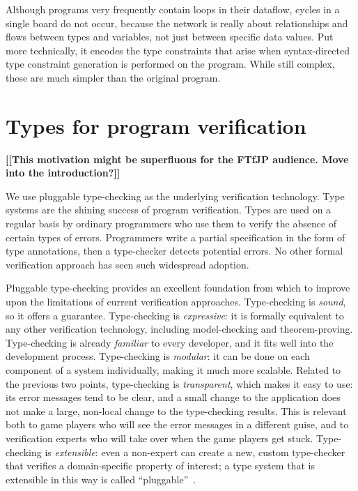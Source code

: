 \documentclass{sig-alternate}
\newcommand{\todo}[1]{{\color{red}\bfseries [[#1]]}}
\begin{document}
Although programs very frequently contain loops in their dataflow,
cycles in a single board do not occur, because the network is really
about relationships and flows between types and variables, not just
between specific data values.  Put more technically, it encodes the
type constraints that arise when syntax-directed type constraint
generation is performed on the program.  While still complex, these
are much simpler than the original program.



\section{Types for program verification}
\label{sec:types}

\todo{This motivation might be superfluous for the FTfJP
  audience. Move into the introduction?}

We use pluggable type-checking as the underlying verification
technology.  Type systems are the shining success of program
verification.  Types are used on a regular basis by ordinary
programmers who use them to verify the absence of certain types of
errors.  Programmers write a partial specification in the form of type
annotations, then a type-checker detects potential errors.  No other
formal verification approach has seen such widespread adoption.

Pluggable type-checking provides an excellent foundation from which to
improve upon the limitations of current verification
approaches. Type-checking is \emph{sound}, so it offers a guarantee.
Type-checking is \emph{expressive}: it is formally equivalent
\cite{CurryHoward2006,MartinLoef1984,CoquandHuet1988,Cousot1997,CousotCousot2000,NaikPalsberg2005}
to any other verification technology, including model-checking and
theorem-proving.  Type-checking is already \emph{familiar} to every
developer, and it fits well into the development process.
Type-checking is \emph{modular}: it can be done on each component of a
system individually, making it much more scalable.  Related to the
previous two points, type-checking is \emph{transparent}, which makes
it easy to use: its error messages tend to be clear, and a small
change to the application does not make a large, non-local change to
the type-checking results.  This is relevant both to game players who
will see the error messages in a different guise, and to verification
experts who will take over when the game players get stuck.
Type-checking is \emph{extensible}: even a non-expert can create a
new, custom type-checker that verifies a domain-specific property of
interest; a type system that is extensible in this way is called
``pluggable''~\cite{Bracha2004}.
\end{document}
